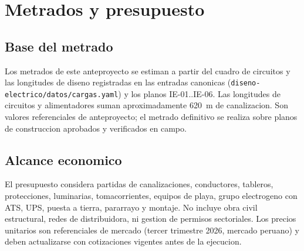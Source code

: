 \chapter{Metrados y presupuesto}

\section{Base del metrado}
Los metrados de este anteproyecto se estiman a partir del cuadro de circuitos
y las longitudes de diseno registradas en las entradas canonicas
(\texttt{diseno-electrico/datos/cargas.yaml}) y los planos IE-01..IE-06. Las
longitudes de circuitos y alimentadores suman aproximadamente 620~m de
canalizacion. Son valores referenciales de anteproyecto; el metrado definitivo
se realiza sobre planos de construccion aprobados y verificados en campo.

\section{Alcance economico}
El presupuesto considera partidas de canalizaciones, conductores, tableros,
protecciones, luminarias, tomacorrientes, equipos de playa, grupo electrogeno
con ATS, UPS, puesta a tierra, pararrayo y montaje. No incluye obra civil
estructural, redes de distribuidora, ni gestion de permisos sectoriales. Los
precios unitarios son referenciales de mercado (tercer trimestre 2026,
mercado peruano) y deben actualizarse con cotizaciones vigentes antes de la
ejecucion.


